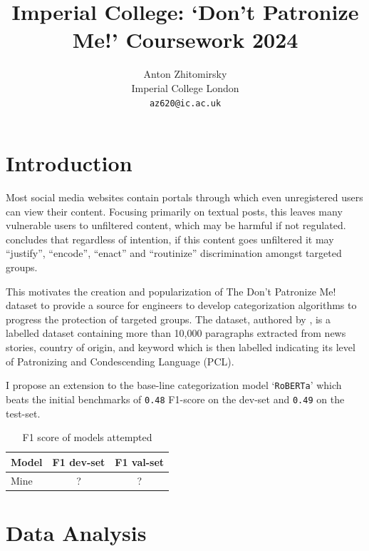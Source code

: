 \documentclass[11pt,a4paper]{article}
\title{Imperial College: `Don't Patronize Me!' Coursework 2024}
\author{Anton Zhitomirsky \\
  Imperial College London \\
  \texttt{az620@ic.ac.uk}
}
\begin{document}
\maketitle

\section{Introduction}


Most social media websites contain portals through which even unregistered users can view their content. Focusing primarily on textual posts, this leaves many vulnerable users to unfiltered content, which may be harmful if not regulated. \citet{Ng-discrimination} concludes that regardless of intention, if this content goes unfiltered it may ``justify'', ``encode'', ``enact'' and ``routinize'' discrimination amongst targeted groups.

This motivates the creation and popularization of The Don't Patronize Me! dataset to provide a source for engineers to develop categorization algorithms to progress the protection of targeted groups. The dataset, authored by \citet{perez-almendros-etal-2020-dont}, is a labelled dataset containing more than 10,000 paragraphs extracted from news stories, country of origin, and keyword which is then labelled indicating its level of Patronizing and Condescending Language (PCL).

I propose an extension to the base-line categorization model `\texttt{RoBERTa}' which beats the initial benchmarks of \texttt{0.48} F1-score on the dev-set and \texttt{0.49} on the test-set.

\begin{table}[!h]
    \centering
    \begin{tabular}{ |l||c|c|  }
        \hline
        Model              & F1 dev-set & F1 val-set \\
        \hline
        Mine               & ?          & ?          \\
        \hline
    \end{tabular}
    \caption{F1 score of models attempted}    
\end{table}

\section{Data Analysis}
\end{document}
